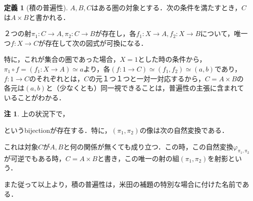 \documentclass[uplatex, 12pt, dvipdfmx]{jsreport}
\theoremstyle{definition}
\newtheorem{definition}[theorem]{定義}
\newtheorem{remark}[theorem]{注}
\theoremstyle{StatementsWithStar}
\theoremstyle{StatementsWithStar2}
\theoremstyle{StatementsWithStar3}
\theoremstyle{StatementsWithCCirc}
\theoremstyle{definition}
\begin{document}
\begin{shadebox}\begin{definition}[積の普遍性]
    $A,B,C$はある圏の対象とする．次の条件を満たすとき，$C$は$A\times B$と書かれる．

    ２つの射$\pi_1:C\to A,\pi_2:C\to B$が存在し，各$f_1:X\to A, f_2:X\to B$について，唯一つ$f:X\to C$が存在して次の図式が可換になる．

    \begin{center}\end{center}
\end{definition}\end{shadebox}
特に，これが集合の圏であった場合，$X=1$とした時の条件から，$\pi_1\circ f = (f_1:X\to A) \simeq a$より，各$(f:1\to C) \simeq (f_1,f_2) \simeq (a,b)$であり，$f:1\to C$のそれぞれとは，$C$の元１つ１つと一対一対応するから，$C=A\times B$の各元は$(a,b)$と（少なくとも）同一視できることは，普遍性の主張に含まれていることがわかる．

\begin{remark}\rm{}
    上の状況下で，
    \begin{center}\end{center}
    というbijectionが存在する．特に，$(\pi_1,\pi_2)$の像は次の自然変換である．
    \begin{center}\end{center}
    これは対象$C$が$A,B$と何の関係が無くても成り立つ．この時，この自然変換$\varphi_{\pi_1,\pi_2}$が可逆でもある時，$C=A\times B$と書き，この唯一の射の組$(\pi_1,\pi_2)$を射影という．

    また従って以上より，積の普遍性は，米田の補題の特別な場合に付けた名前である．
\end{remark}
\end{document}
